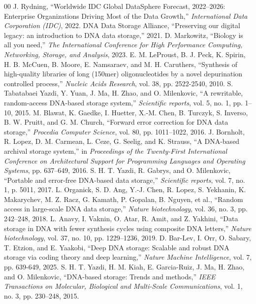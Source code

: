 \documentclass[11pt,a4paper,reqno,twoside]{article}
\theoremstyle{definition}
\begin{document}
\begin{thebibliography}{00}
 J. Rydning, ``Worldwide IDC Global DataSphere Forecast, 2022–2026: Enterprise Organizations Driving Most of the Data Growth,'' \emph{International Data Corporation (IDC)}, 2022.
 DNA Data Storage Alliance, ``Preserving our digital legacy: an introduction to DNA data storage,'' 2021.
 D. Markowitz, ``Biology is all you need,'' \emph{The International Conference for High Performance Computing, Networking, Storage, and Analysis}, 2023.
 E. M. LeProust, B. J. Peck, K. Spirin, H. B. McCuen, B. Moore, E. Namsaraev, and M. H. Caruthers, ``Synthesis of high-quality libraries of long (150mer) oligonucleotides by a novel depurination controlled process,'' \emph{Nucleic Acids Research}, vol. 38, pp. 2522-2540, 2010.
 S. Tabatabaei Yazdi, Y. Yuan, J. Ma, H. Zhao, and O. Milenkovic, ``A rewritable, random-access DNA-based storage system,'' \emph{Scientific reports}, vol. 5, no. 1, pp. 1–10, 2015.
 M. Blawat, K. Gaedke, I. Huetter, X.-M. Chen, B. Turczyk, S. Inverso, B. W. Pruitt, and G. M. Church, ``Forward error correction for DNA data storage,'' \emph{Procedia Computer Science}, vol. 80, pp. 1011–1022, 2016.
 J. Bornholt, R. Lopez, D. M. Carmean, L. Ceze, G. Seelig, and K. Strauss,
``A DNA-based archival storage system,'' in \emph{Proceedings of the Twenty-First International Conference on Architectural Support for Programming Languages and Operating Systems}, pp. 637–649, 2016.
 S. H. T. Yazdi, R. Gabrys, and O. Milenkovic, ``Portable and error-free DNA-based data storage,'' \emph{Scientific reports}, vol. 7, no. 1, p. 5011, 2017.
 L. Organick, S. D. Ang, Y.-J. Chen, R. Lopez, S. Yekhanin, K. Makarychev, M. Z. Racz, G. Kamath, P. Gopalan, B. Nguyen, et al., ``Random access in large-scale DNA data storage,'' \emph{Nature biotechnology}, vol. 36, no. 3, pp. 242–248, 2018.
 L. Anavy, I. Vaknin, O. Atar, R. Amit, and Z. Yakhini, ``Data storage in DNA with fewer synthesis cycles using composite DNA letters,'' \emph{Nature biotechnology}, vol. 37, no. 10, pp. 1229–1236, 2019.
 D. Bar-Lev, I. Orr, O. Sabary, T. Etzion, and E. Yaakobi, ``Deep DNA storage: Scalable and robust DNA storage via coding theory and deep learning,'' \emph{Nature Machine Intelligence}, vol. 7, pp. 639-649, 2025.
 S. H. T. Yazdi, H. M. Kiah, E. Garcia-Ruiz, J. Ma, H. Zhao, and O. Milenkovic, ``DNA-based storage: Trends and methods,'' \emph{IEEE Transactions on Molecular, Biological and Multi-Scale Communications}, vol. 1, no. 3, pp. 230–248, 2015.

\end{thebibliography}
\end{document}
